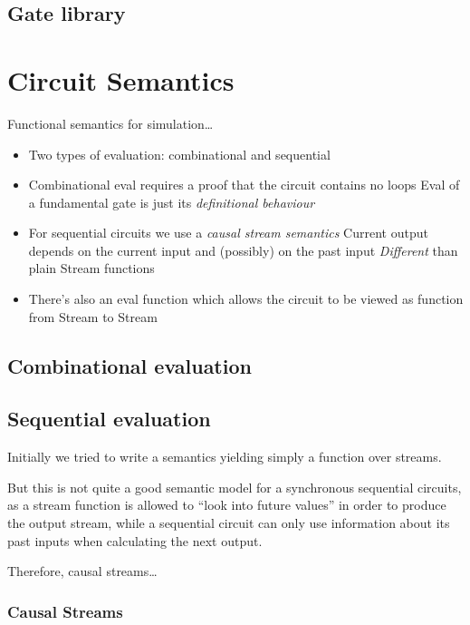         \subsection{Gate library}
        \label{subsec:gate-library}


    \section{Circuit Semantics}
    \label{sec:circuit-semantics}
        Functional semantics for simulation\ldots

        \begin{itemize}
            \item Two types of evaluation: combinational and sequential
            \item Combinational eval requires a proof that the circuit contains no loops
                \subitem Eval of a fundamental gate is just its \emph{definitional behaviour}

            \item For sequential circuits we use a \emph{causal stream semantics}
                \subitem Current output depends on the current input and (possibly) on the past input
                \subitem \emph{Different} than plain Stream functions

            \item There's also an eval function which allows the circuit to be viewed as function from Stream to Stream
        \end{itemize}

        \subsection{Combinational evaluation}
        \label{subsec:combinational-eval}

        \subsection{Sequential evaluation}
        \label{subsec:sequential-eval}
            Initially we tried to write a semantics yielding simply a function over streams.

            But this is not quite a good semantic model for a synchronous sequential circuits,
            as a stream function is allowed to ``look into future values'' in order to produce
            the output stream, while a sequential circuit can only use information about its past inputs
            when calculating the next output.

            Therefore, causal streams\ldots

            \subsubsection{Causal Streams}
